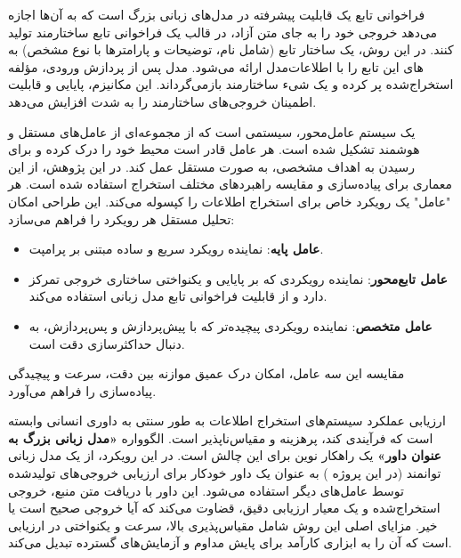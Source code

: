 
فراخوانی تابع یک قابلیت پیشرفته در مدل‌های زبانی بزرگ است که به آن‌ها اجازه می‌دهد خروجی خود را به جای متن آزاد، در قالب یک فراخوانی تابع ساختارمند تولید کنند. در این روش، یک ساختار تابع (شامل نام، توضیحات و پارامترها با نوع مشخص) به مدل ارائه می‌شود. مدل پس از پردازش ورودی، مؤلفه‎‌های این تابع را با اطلاعات استخراج‌شده پر کرده و یک شیء ساختارمند بازمی‌گرداند. این مکانیزم، پایایی و قابلیت اطمینان خروجی‌های ساختارمند را به شدت افزایش می‌دهد.


یک سیستم عامل‌محور، سیستمی است که از مجموعه‌ای از عامل‌های مستقل و هوشمند تشکیل شده است. هر عامل قادر است محیط خود را درک کرده و برای رسیدن به اهداف مشخصی، به صورت مستقل عمل کند. در این پژوهش، از این معماری برای پیاده‌سازی و مقایسه راهبردهای مختلف استخراج استفاده شده است. هر "عامل" یک رویکرد خاص برای استخراج اطلاعات را کپسوله می‌کند. این طراحی امکان تحلیل مستقل هر رویکرد را فراهم می‌سازد:
\begin{itemize}
    \item \textbf{عامل پایه}: نماینده رویکرد سریع و ساده مبتنی بر پرامپت.
    \item \textbf{عامل تابع‌محور}: نماینده رویکردی که بر پایایی و یکنواختی ساختاری خروجی تمرکز دارد و از قابلیت فراخوانی تابع مدل زبانی استفاده می‌کند.
    \item \textbf{عامل متخصص}: نماینده رویکردی پیچیده‌تر که با پیش‌پردازش و پس‌پردازش، به دنبال حداکثرسازی دقت است.
\end{itemize}
مقایسه این سه عامل، امکان درک عمیق موازنه بین دقت، سرعت و پیچیدگی پیاده‌سازی را فراهم می‌آورد.

ارزیابی عملکرد سیستم‌های استخراج اطلاعات به طور سنتی به داوری انسانی وابسته است که فرآیندی کند، پرهزینه و مقیاس‌ناپذیر است. الگوواره \textbf{«مدل زبانی بزرگ به عنوان داور»} یک راهکار نوین برای این چالش است. در این رویکرد، از یک مدل زبانی توانمند (در این پروژه ) به عنوان یک داور خودکار برای ارزیابی خروجی‌های تولیدشده توسط عامل‌های دیگر استفاده می‌شود. این داور با دریافت متن منبع، خروجی استخراج‌شده و یک معیار ارزیابی دقیق، قضاوت می‌کند که آیا خروجی صحیح است یا خیر. مزایای اصلی این روش شامل مقیاس‌پذیری بالا، سرعت و یکنواختی در ارزیابی است که آن را به ابزاری کارآمد برای پایش مداوم و آزمایش‌های گسترده تبدیل می‌کند.



